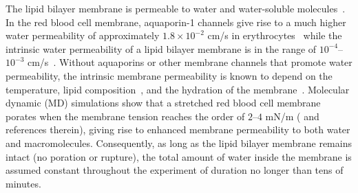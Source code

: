 \documentclass[9pt,twocolumn,twoside,lineno]{pnas-new}
\begin{document}
The lipid bilayer membrane is permeable to water and water-soluble
molecules~\cite{Dick1964_JTB, FettiplaceHaydon1980_PhysRev,
DeamerBramhall1986_ChemPhysLipids, Grafmueller2019_ABLS}. 
%
%
In the red blood cell membrane, aquaporin-1 channels give rise to a much
higher water permeability of approximately $1.8\times 10^{-2}$ cm/s in
erythrocytes~\cite{YangMaVerkman2001_JBC} while the intrinsic water
permeability of a lipid bilayer membrane is in the range of
$10^{-4}$--$10^{-3}$ cm/s~\cite{ThompsonHuang1966_ANYAS,
FettiplaceHaydon1980_PhysRev, Grafmueller2019_ABLS, Dimova2020_GVB,
BhatiaRobinsonDimova2020_SoftMatt}. 
Without aquaporins or other membrane channels that promote water
permeability, the intrinsic membrane permeability is known to depend on the
temperature, lipid composition~\cite{OlbrichRawiczNeedhamEtAl2000_BJ},
and the hydration of the membrane~\cite{MarrinkBerendsen1994_JPhysChem}.
%
Molecular dynamic (MD) simulations show that a stretched red blood cell
membrane porates when the membrane tension reaches the order of $2$--$4$
mN/m (\cite{RazizadehNikfarPaulLiu2020_BJ} and references therein),
giving rise to enhanced membrane permeability to both water and
macromolecules. Consequently, as long as the lipid bilayer membrane
remains intact (no poration or rupture), the total amount of water inside the membrane 
is assumed constant throughout the experiment of duration
no longer than tens of minutes.
%
\end{document}
